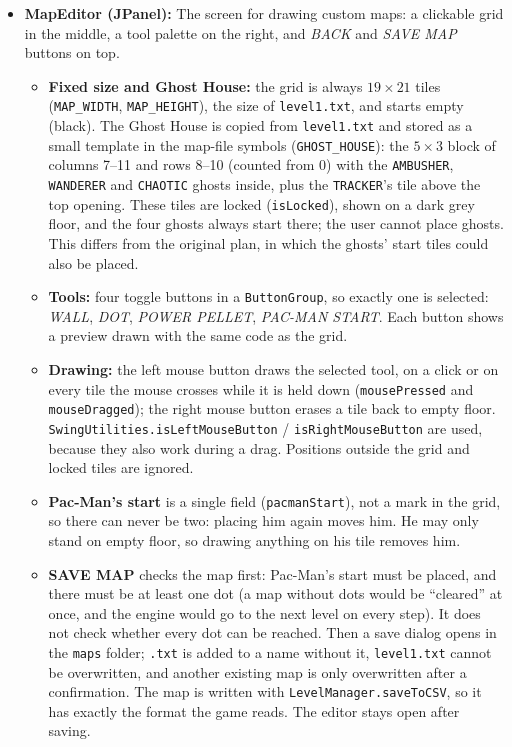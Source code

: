 \documentclass[11pt, a4paper]{article}
\begin{document}
\begin{itemize}
    \item \textbf{MapEditor (JPanel):} The screen for drawing custom maps: a clickable grid in the middle, a tool palette on the right, and \textit{BACK} and \textit{SAVE MAP} buttons on top.
    \begin{itemize}
        \item \textbf{Fixed size and Ghost House:} the grid is always $19 \times 21$ tiles (\texttt{MAP\_WIDTH}, \texttt{MAP\_HEIGHT}), the size of \texttt{level1.txt}, and starts empty (black). The Ghost House is copied from \texttt{level1.txt} and stored as a small template in the map-file symbols (\texttt{GHOST\_HOUSE}): the $5 \times 3$ block of columns 7--11 and rows 8--10 (counted from 0) with the \texttt{AMBUSHER}, \texttt{WANDERER} and \texttt{CHAOTIC} ghosts inside, plus the \texttt{TRACKER}'s tile above the top opening. These tiles are locked (\texttt{isLocked}), shown on a dark grey floor, and the four ghosts always start there; the user cannot place ghosts. This differs from the original plan, in which the ghosts' start tiles could also be placed.
        \item \textbf{Tools:} four toggle buttons in a \texttt{ButtonGroup}, so exactly one is selected: \textit{WALL}, \textit{DOT}, \textit{POWER PELLET}, \textit{PAC-MAN START}. Each button shows a preview drawn with the same code as the grid.
        \item \textbf{Drawing:} the left mouse button draws the selected tool, on a click or on every tile the mouse crosses while it is held down (\texttt{mousePressed} and \texttt{mouseDragged}); the right mouse button erases a tile back to empty floor. \texttt{SwingUtilities.isLeftMouseButton} / \texttt{isRightMouseButton} are used, because they also work during a drag. Positions outside the grid and locked tiles are ignored.
        \item \textbf{Pac-Man's start} is a single field (\texttt{pacmanStart}), not a mark in the grid, so there can never be two: placing him again moves him. He may only stand on empty floor, so drawing anything on his tile removes him.
        \item \textbf{SAVE MAP} checks the map first: Pac-Man's start must be placed, and there must be at least one dot (a map without dots would be ``cleared'' at once, and the engine would go to the next level on every step). It does not check whether every dot can be reached. Then a save dialog opens in the \texttt{maps} folder; \texttt{.txt} is added to a name without it, \texttt{level1.txt} cannot be overwritten, and another existing map is only overwritten after a confirmation. The map is written with \texttt{LevelManager.saveToCSV}, so it has exactly the format the game reads. The editor stays open after saving.

\end{itemize}
\end{itemize}
\end{document}
